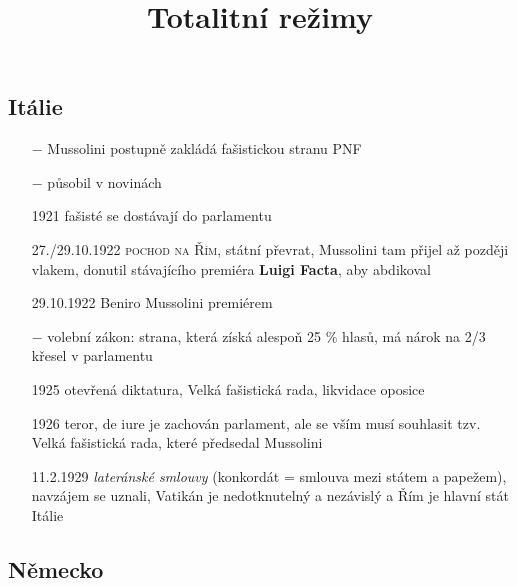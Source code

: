 \documentclass{article}
\title{\vspace{-2cm}Totalitní režimy\vspace{-1.7cm}}
\date{}
\author{}
\begin{document}
\maketitle

\subsection*{Itálie}
\begin{itemize}
    \vspace{-0.5em}
    \setlength\itemsep{0.15em}
    \item[$-$] Mussolini postupně zakládá fašistickou stranu PNF
    \item[$-$] působil v novinách
    \item[1921] fašisté se dostávají do parlamentu
    \item[27./29.10.1922] \textsc{pochod na Řím}, státní převrat, Mussolini tam přijel až později vlakem, donutil stávajícího premiéra \textbf{Luigi Facta}, aby abdikoval
    \item[29.10.1922] Beniro Mussolini premiérem
    \item[$-$] volební zákon: strana, která získá alespoň 25 \% hlasů, má nárok na 2/3 křesel v parlamentu
    \item[1925] otevřená diktatura, Velká fašistická rada, likvidace oposice
    \item[1926] teror, de iure je zachován parlament, ale se vším musí souhlasit tzv. Velká fašistická rada, které předsedal Mussolini
    \item[11.2.1929] \textit{lateránské smlouvy} (konkordát = smlouva mezi státem a papežem), navzájem se uznali, Vatikán je nedotknutelný a nezávislý a Řím je hlavní stát Itálie
\end{itemize}

\subsection*{Německo}
\end{document}
